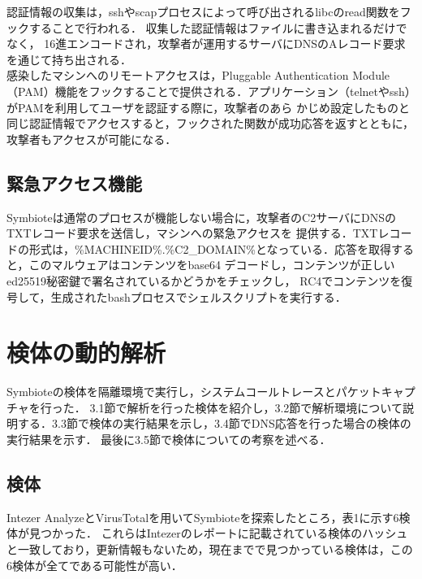 \documentclass[submit,techreq,noauthor]{eco}	%
\begin{document}
認証情報の収集は，sshやscapプロセスによって呼び出されるlibcのread関数をフックすることで行われる．
収集した認証情報はファイルに書き込まれるだけでなく，
16進エンコードされ，攻撃者が運用するサーバにDNSのAレコード要求を通じて持ち出される．\\
\indent
感染したマシンへのリモートアクセスは，Pluggable Authentication
Module（PAM）機能をフックすることで提供される．アプリケーション（telnetやssh）がPAMを利用してユーザを認証する際に，攻撃者のあら
かじめ設定したものと同じ認証情報でアクセスすると，フックされた関数が成功応答を返すとともに，攻撃者もアクセスが可能になる．

\subsection{緊急アクセス機能}
Symbioteは通常のプロセスが機能しない場合に，攻撃者のC2サーバにDNSのTXTレコード要求を送信し，マシンへの緊急アクセスを
提供する．TXTレコードの形式は，\%MACHINEID\%.\%C2\_DOMAIN\%となっている．応答を取得すると，このマルウェアはコンテンツをbase64
デコードし，コンテンツが正しいed25519秘密鍵で署名されているかどうかをチェックし，
RC4でコンテンツを復号して，生成されたbashプロセスでシェルスクリプトを実行する．\\


\section{検体の動的解析}
Symbioteの検体を隔離環境で実行し，システムコールトレースとパケットキャプチャを行った．
3.1節で解析を行った検体を紹介し，3.2節で解析環境について説明する．3.3節で検体の実行結果を示し，3.4節でDNS応答を行った場合の検体の実行結果を示す．
最後に3.5節で検体についての考察を述べる．
\subsection{検体}
Intezer AnalyzeとVirusTotalを用いてSymbioteを探索したところ，表1に示す6検体が見つかった．
これらはIntezerのレポートに記載されている検体のハッシュと一致しており，更新情報もないため，現在までで見つかっている検体は，この6検体が全てである可能性が高い．
\end{document}
